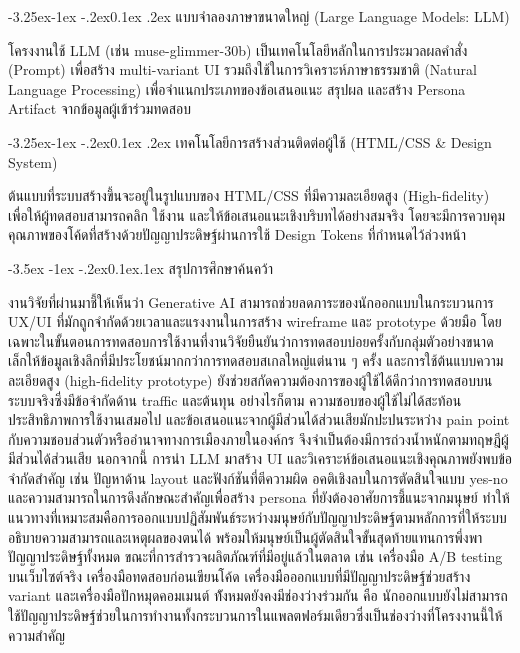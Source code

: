 \documentclass[a4paper,oneside]{cpe-thesis-th}
\makeatletter
\renewcommand\section{\@startsection{section}{1}{\z@}%
   {-3.5ex \@plus -1ex \@minus -.2ex}{0.1ex\@plus.1ex}%
   {\normalfont\thsz@section\bfseries}}
\renewcommand\subsection{\@startsection{subsection}{2}{\z@}%
   {-3.25ex\@plus -1ex \@minus -.2ex}{0.1ex \@plus .2ex}%
   {\normalfont\thsz@subsection\bfseries}}
\newcommand{\thaijustify}[1]{%
  \par\hspace{30pt}\justifying
  #1
}
\makeatother
\begin{document}
\subsection{แบบจำลองภาษาขนาดใหญ่ (Large Language Models: LLM)}
\thaijustify{
  โครงงานใช้ LLM (เช่น muse-glimmer-30b) เป็นเทคโนโลยีหลักในการประมวลผลคำสั่ง (Prompt) เพื่อสร้าง multi-variant UI รวมถึงใช้ในการวิเคราะห์ภาษาธรรมชาติ (Natural Language Processing) เพื่อจำแนกประเภทของข้อเสนอแนะ สรุปผล และสร้าง Persona Artifact จากข้อมูลผู้เข้าร่วมทดสอบ
}

\subsection{เทคโนโลยีการสร้างส่วนติดต่อผู้ใช้ (HTML/CSS \& Design System)}
\thaijustify{
  ต้นแบบที่ระบบสร้างขึ้นจะอยู่ในรูปแบบของ HTML/CSS ที่มีความละเอียดสูง (High-fidelity) เพื่อให้ผู้ทดสอบสามารถคลิก ใช้งาน และให้ข้อเสนอแนะเชิงบริบทได้อย่างสมจริง โดยจะมีการควบคุมคุณภาพของโค้ดที่สร้างด้วยปัญญาประดิษฐ์ผ่านการใช้ Design Tokens ที่กำหนดไว้ล่วงหน้า
}

\section{สรุปการศึกษาค้นคว้า}
\thaijustify{
  งานวิจัยที่ผ่านมาชี้ให้เห็นว่า Generative AI สามารถช่วยลดภาระของนักออกแบบในกระบวนการ UX/UI ที่มักถูกจำกัดด้วยเวลาและแรงงานในการสร้าง wireframe และ prototype ด้วยมือ \cite{suh2025storyensemble, feng2023designing, yuan2024towards} โดยเฉพาะในขั้นตอนการทดสอบการใช้งานที่งานวิจัยยืนยันว่าการทดสอบบ่อยครั้งกับกลุ่มตัวอย่างขนาดเล็กให้ข้อมูลเชิงลึกที่มีประโยชน์มากกว่าการทดสอบสเกลใหญ่แต่นาน ๆ ครั้ง \cite{nielsen2000five, virzi1992refining, nielsen1993mathematical} และการใช้ต้นแบบความละเอียดสูง (high-fidelity prototype) ยังช่วยสกัดความต้องการของผู้ใช้ได้ดีกว่าการทดสอบบนระบบจริงซึ่งมีข้อจำกัดด้าน traffic และต้นทุน \cite{pacheco2018, kolthoff2024, lu2026} อย่างไรก็ตาม ความชอบของผู้ใช้ไม่ได้สะท้อนประสิทธิภาพการใช้งานเสมอไป \cite{nngroup_satisfaction, nngroup_qualitative} และข้อเสนอแนะจากผู้มีส่วนได้ส่วนเสียมักปะปนระหว่าง pain point กับความชอบส่วนตัวหรืออำนาจทางการเมืองภายในองค์กร จึงจำเป็นต้องมีการถ่วงน้ำหนักตามทฤษฎีผู้มีส่วนได้ส่วนเสีย \cite{shukla2025, mitchell1997} นอกจากนี้ การนำ LLM มาสร้าง UI และวิเคราะห์ข้อเสนอแนะเชิงคุณภาพยังพบข้อจำกัดสำคัญ เช่น ปัญหาด้าน layout และฟังก์ชันที่ตีความผิด \cite{kolthoff2024} อคติเชิงลบในการตัดสินใจแบบ yes-no \cite{song2025} และความสามารถในการดึงลักษณะสำคัญเพื่อสร้าง persona ที่ยังต้องอาศัยการชี้แนะจากมนุษย์ \cite{shin2024} ทำให้แนวทางที่เหมาะสมคือการออกแบบปฏิสัมพันธ์ระหว่างมนุษย์กับปัญญาประดิษฐ์ตามหลักการที่ให้ระบบอธิบายความสามารถและเหตุผลของตนได้ \cite{amershi2019} พร้อมให้มนุษย์เป็นผู้ตัดสินใจขั้นสุดท้ายแทนการพึ่งพาปัญญาประดิษฐ์ทั้งหมด \cite{pourasad2025} ขณะที่การสำรวจผลิตภัณฑ์ที่มีอยู่แล้วในตลาด เช่น เครื่องมือ A/B testing บนเว็บไซต์จริง \cite{kameleoon, otterab} เครื่องมือทดสอบก่อนเขียนโค้ด \cite{lyssna, useberry} เครื่องมือออกแบบที่มีปัญญาประดิษฐ์ช่วยสร้าง variant \cite{figma_agent} และเครื่องมือปักหมุดคอมเมนต์ \cite{bugherd, markerio} ท้ังหมดยังคงมีช่องว่างร่วมกัน คือ นักออกแบบยังไม่สามารถใช้ปัญญาประดิษฐ์ช่วยในการทำงานทั้งกระบวนการในแพลตฟอร์มเดียวซึ่งเป็นช่องว่างที่โครงงานนี้ให้ความสำคัญ
}
\end{document}
